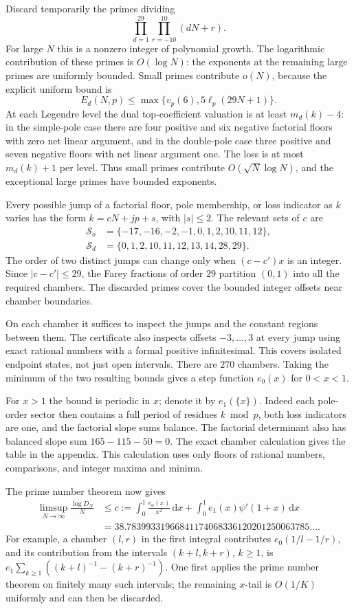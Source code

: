 \documentclass[11pt]{article}
\newcommand{\dd}{\mathrm d}
\begin{document}
Discard temporarily the primes dividing
\[
 \prod_{d=1}^{29}\prod_{r=-10}^{10}(dN+r).
\]
For large $N$ this is a nonzero integer of polynomial growth. The logarithmic
contribution of these primes is $O(\log N)$: the exponents at the remaining
large primes are uniformly bounded. Small primes contribute $o(N)$, because
the explicit uniform bound is
\[
 E_d(N,p)\le\max\{v_p(6),5\ell_p(29N+1)\}.
\]
At each Legendre level the dual top-coefficient valuation is at least
$m_d(k)-4$: in the simple-pole case there are four positive and six negative
factorial floors with zero net linear argument, and in the double-pole case
three positive and seven negative floors with net linear argument one.
The loss is at most $m_d(k)+1$ per level. Thus small primes contribute
$O(\sqrt N\log N)$, and the exceptional large primes have bounded exponents.

Every possible jump of a factorial floor, pole membership, or loss indicator
as $k$ varies has the form $k=cN+jp+s$, with $|s|\le2$. The relevant sets
of $c$ are
\begin{align*}
 \mathcal S_o&=\{-17,-16,-2,-1,0,1,2,10,11,12\},\\
 \mathcal S_d&=\{0,1,2,10,11,12,13,14,28,29\}.
\end{align*}
The order of two distinct jumps can change only when
$(c-c')x$ is an integer. Since $|c-c'|\le29$, the Farey fractions of order
$29$ partition $(0,1)$ into all the required chambers. The discarded primes
cover the bounded integer offsets near chamber boundaries.

On each chamber it suffices to inspect the jumps and the constant regions
between them. The certificate also inspects offsets $-3,\ldots,3$ at every
jump using exact rational numbers with a formal positive infinitesimal.
This covers isolated endpoint states, not just open intervals.
There are $270$ chambers. Taking the minimum of the two resulting bounds
gives a step function $e_0(x)$ for $0<x<1$.

For $x>1$ the bound is periodic in $x$; denote it by $e_1(\{x\})$.
Indeed each pole-order sector then contains a full period of residues
$k\bmod p$, both loss indicators are one, and the factorial slope sums
balance. The factorial determinant also has balanced slope sum
$165-115-50=0$. The exact chamber calculation gives the table in the
appendix. This calculation uses only floors of rational numbers, comparisons,
and integer maxima and minima.

The prime number theorem now gives
\begin{align}\label{eq:c}
 \limsup_{N\to\infty}\frac{\log D_N}{N}
 &\le c:=\int_0^1\frac{e_0(x)}{x^2}\,\dd x
       +\int_0^1e_1(x)\psi'(1+x)\,\dd x\\
 &=38.78399331966841174068336120201250063785\ldots.\nonumber
\end{align}
For example, a chamber $(l,r)$ in the first integral contributes
$e_0(1/l-1/r)$, and its contribution from the intervals $(k+l,k+r)$,
$k\ge1$, is
$e_1\sum_{k\ge1}((k+l)^{-1}-(k+r)^{-1})$.
One first applies the prime number theorem on finitely many such intervals;
the remaining $x$-tail is $O(1/K)$ uniformly and can then be discarded.
\end{document}
